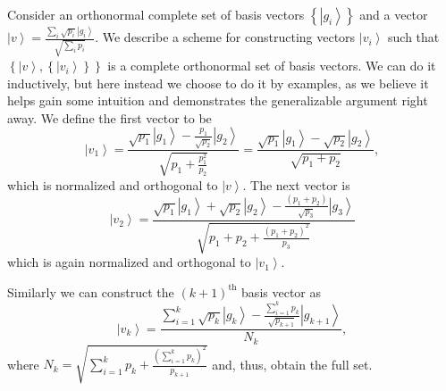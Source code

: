 \documentclass{theoretics}
\begin{document}
Consider an orthonormal complete set of basis vectors $\left\{ \left|g_{i}\right\rangle \right\} $
and a vector $\left|v\right\rangle =\frac{\sum_{i}\sqrt{p_{i}}\left|g_{i}\right\rangle }{\sqrt{\sum_{i}p_{i}}}$.
We describe a scheme for constructing vectors $\left|v_{i}\right\rangle $
such that $\left\{ \left|v\right\rangle ,\left\{ \left|v_{i}\right\rangle \right\} \right\} $
is a complete orthonormal set of basis vectors. We can do
it inductively, but here instead we choose to do it by examples, as we believe it helps gain some
intuition and demonstrates the generalizable argument right away.
We define the first vector to be 
\begin{displaymath}
\left|v_{1}\right\rangle =\frac{\sqrt{p_{1}}\left|g_{1}\right\rangle -\frac{p_{1}}{\sqrt{p_{2}}}\left|g_{2}\right\rangle }{\sqrt{p_{1}+\frac{p_{1}^{2}}{p_{2}}}}=\frac{\sqrt{p_{1}}\left|g_{1}\right\rangle -\sqrt{p_{2}}\left|g_{2}\right\rangle }{\sqrt{p_{1}+p_{2}}},
\end{displaymath}
which is normalized and orthogonal to $\left|v\right\rangle $. The next
vector is 
\begin{displaymath}
\left|v_{2}\right\rangle =\frac{\sqrt{p_{1}}\left|g_{1}\right\rangle +\sqrt{p_{2}}\left|g_{2}\right\rangle -\frac{\left(p_{1}+p_{2}\right)}{\sqrt{p_{3}}}\left|g_{3}\right\rangle }{\sqrt{p_{1}+p_{2}+\frac{(p_{1}+p_{2})^{2}}{p_{3}}}}
\end{displaymath}
which is again normalized and orthogonal to $\left|v_{1}\right\rangle $.

Similarly we can construct the $\left(k+1\right)^{\text{th}}$ basis
vector as 
\begin{displaymath}
\left|v_{k}\right\rangle =\frac{\sum_{i=1}^{k}\sqrt{p_{k}}\left|g_{k}\right\rangle -\frac{\sum_{i=1}^{k}p_{k}}{\sqrt{p_{k+1}}}\left|g_{k+1}\right\rangle }{N_{k}},
\end{displaymath}
where $N_{k}=\sqrt{\sum_{i=1}^{k}p_{k}+\frac{(\sum_{i=1}^{k}p_{k})^{2}}{p_{k+1}}}$
and, thus, obtain the full set.
\end{document}
